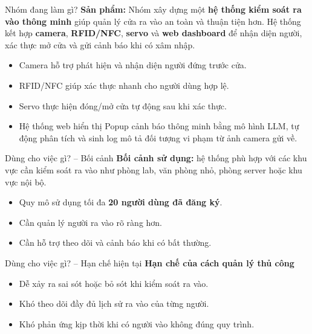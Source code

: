 \documentclass[aspectratio=169]{beamer}
\begin{document}
\begin{frame}{Nhóm đang làm gì?}
  \textbf{Sản phẩm:} Nhóm xây dựng một \textbf{hệ thống kiểm soát ra vào thông minh} giúp quản lý cửa ra vào an toàn và thuận tiện hơn. Hệ thống kết hợp \textbf{camera}, \textbf{RFID/NFC}, \textbf{servo} và \textbf{web dashboard} để nhận diện người, xác thực mở cửa và gửi cảnh báo khi có xâm nhập.

  \vspace{0.8em}
  \begin{itemize}
    \item Camera hỗ trợ phát hiện và nhận diện người đứng trước cửa.
    \item RFID/NFC giúp xác thực nhanh cho người dùng hợp lệ.
    \item Servo thực hiện đóng/mở cửa tự động sau khi xác thực.
    \item Hệ thống web hiển thị Popup cảnh báo thông minh bằng mô hình LLM, tự động phân tích và sinh log mô tả đối tượng vi phạm từ ảnh camera gửi về.
  \end{itemize}
\end{frame}

\begin{frame}{Dùng cho việc gì? -- Bối cảnh}
  \textbf{Bối cảnh sử dụng:} hệ thống phù hợp với các khu vực cần kiểm soát ra vào như phòng lab, văn phòng nhỏ, phòng server hoặc khu vực nội bộ.

  \vspace{0.8em}
  \begin{itemize}
    \item Quy mô sử dụng tối đa \textbf{20 người dùng đã đăng ký}.
    \item Cần quản lý người ra vào rõ ràng hơn.
    \item Cần hỗ trợ theo dõi và cảnh báo khi có bất thường.
  \end{itemize}
\end{frame}

\begin{frame}{Dùng cho việc gì? -- Hạn chế hiện tại}
  \textbf{Hạn chế của cách quản lý thủ công}

  \vspace{0.8em}
  \begin{itemize}
    \item Dễ xảy ra sai sót hoặc bỏ sót khi kiểm soát ra vào.
    \item Khó theo dõi đầy đủ lịch sử ra vào của từng người.
    \item Khó phản ứng kịp thời khi có người vào không đúng quy trình.
  \end{itemize}
\end{frame}
\end{document}
